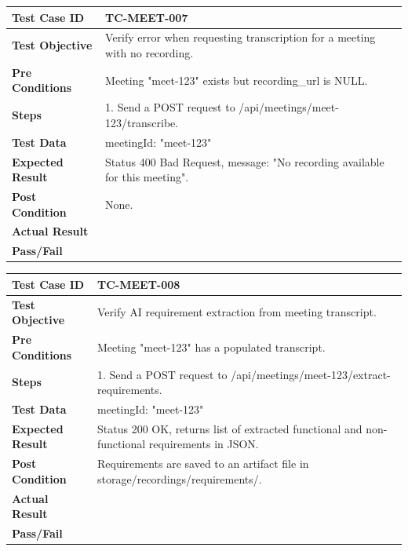 \begin{longtable}{|p{}|p{}|}
\hline
\textbf{Test Case ID} & TC-MEET-007 \\ \hline
\textbf{Test Objective} & Verify error when requesting transcription for a meeting with no recording. \\ \hline
\textbf{Pre Conditions} & Meeting "meet-123" exists but recording\_url is NULL. \\ \hline
\textbf{Steps} & 
1. Send a POST request to /api/meetings/meet-123/transcribe. \\ \hline
\textbf{Test Data} & meetingId: "meet-123" \\ \hline
\textbf{Expected Result} & Status 400 Bad Request, message: "No recording available for this meeting". \\ \hline
\textbf{Post Condition} & None. \\ \hline
\textbf{Actual Result} &  \\ \hline
\textbf{Pass/Fail} &  \\ \hline
\end{longtable}

\begin{longtable}{|p{}|p{}|}
\hline
\textbf{Test Case ID} & TC-MEET-008 \\ \hline
\textbf{Test Objective} & Verify AI requirement extraction from meeting transcript. \\ \hline
\textbf{Pre Conditions} & Meeting "meet-123" has a populated transcript. \\ \hline
\textbf{Steps} & 
1. Send a POST request to /api/meetings/meet-123/extract-requirements. \\ \hline
\textbf{Test Data} & meetingId: "meet-123" \\ \hline
\textbf{Expected Result} & Status 200 OK, returns list of extracted functional and non-functional requirements in JSON. \\ \hline
\textbf{Post Condition} & Requirements are saved to an artifact file in storage/recordings/requirements/. \\ \hline
\textbf{Actual Result} &  \\ \hline
\textbf{Pass/Fail} &  \\ \hline
\end{longtable}

